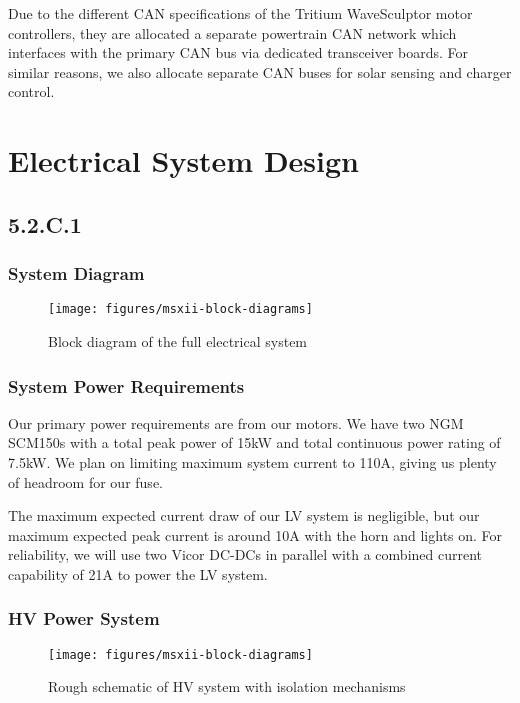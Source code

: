 \documentclass[10pt]{article}
\begin{document}
Due to the different CAN specifications of the Tritium WaveSculptor motor controllers, they are allocated a separate powertrain CAN network which interfaces with the primary CAN bus via dedicated transceiver boards. For similar reasons, we also allocate separate CAN buses for solar sensing and charger control.

\section{Electrical System Design}

\subsection{5.2.C.1}

\subsubsection{System Diagram}

\begin{figure}[H]
    \centering
    \texttt{[image: figures/msxii-block-diagrams]}
    \caption{Block diagram of the full electrical system}
    \label{fig:msxii-electrical-full-block-diagram}
\end{figure}

\subsubsection{System Power Requirements}

Our primary power requirements are from our motors. We have two NGM SCM150s with a total peak power of 15kW and total continuous power rating of 7.5kW. We plan on limiting maximum system current to 110A, giving us plenty of headroom for our fuse.

The maximum expected current draw of our LV system is negligible, but our maximum expected peak current is around 10A with the horn and lights on. For reliability, we will use two Vicor DC-DCs in parallel with a combined current capability of 21A to power the LV system.

\subsubsection{HV Power System}

\begin{figure}[H]
    \centering
    \texttt{[image: figures/msxii-block-diagrams]}
    \caption{Rough schematic of HV system with isolation mechanisms}
    \label{fig:msxii-electrical-hv-system}
\end{figure}
\end{document}
